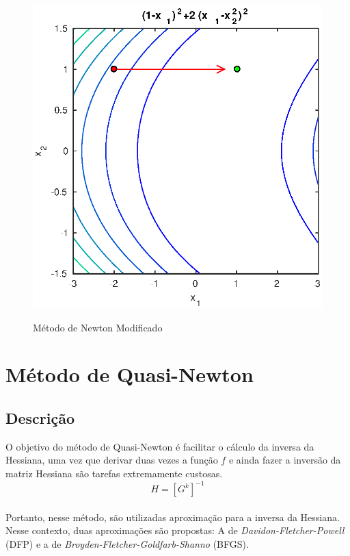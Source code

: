 \documentclass[a4paper,12pt,utf8x,notitlepage]{article}
\begin{document}
\begin{figure}[!htcb]
{\includegraphics[scale=0.6]{newtonmod_level_rosen}
\label{fig:subfigure2}}
\caption{Método de Newton Modificado}
\label{fig:res_newtonmod}
\end{figure}


\section{Método de Quasi-Newton}
\subsection{Descrição}

O objetivo do método de Quasi-Newton é facilitar o cálculo da inversa da Hessiana, uma vez que derivar duas vezes a função $f$ e ainda fazer a inversão da matriz Hessiana são tarefas extremamente custosas.\\

\begin{equation}
H = [G^k]^{-1}
\end{equation}\\

Portanto, nesse método, são utilizadas aproximação para a inversa da Hessiana. Nesse contexto, duas aproximações são propostas: A de \emph{Davidon-Fletcher-Powell} (DFP) e a de \emph{Broyden-Fletcher-Goldfarb-Shanno} (BFGS).\\
\end{document}
